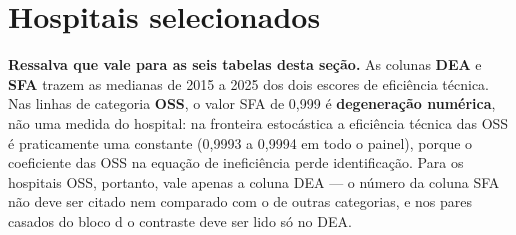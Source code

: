 \documentclass[12pt,a4paper]{article}
\begin{document}
\section{Hospitais selecionados}
\label{sec:selecao}

\noindent\textbf{Ressalva que vale para as seis tabelas desta seção.} As
colunas \textbf{DEA} e \textbf{SFA} trazem as medianas de 2015 a 2025 dos
dois escores de eficiência técnica. Nas linhas de categoria \textbf{OSS},
o valor SFA de 0,999 é \textbf{degeneração numérica}, não uma medida do
hospital: na fronteira estocástica a eficiência técnica das OSS é
praticamente uma constante (0,9993 a 0,9994 em todo o painel), porque o
coeficiente das OSS na equação de ineficiência perde identificação. Para
os hospitais OSS, portanto, vale apenas a coluna DEA --- o número da
coluna SFA não deve ser citado nem comparado com o de outras categorias,
e nos pares casados do bloco d o contraste deve ser lido só no DEA.
\end{document}

